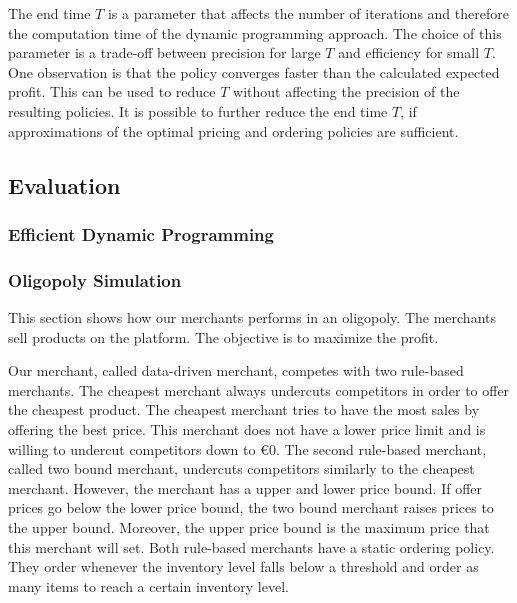 The end time $T$ is a parameter that affects the number of iterations and therefore the computation time of the dynamic programming approach.
The choice of this parameter is a trade-off between precision for large $T$ and efficiency for small $T$.
One observation is that the policy converges faster than the calculated expected profit.
This can be used to reduce $T$ without affecting the precision of the resulting policies.
It is possible to further reduce the end time $T$, if approximations of the optimal pricing and ordering policies are sufficient.


\subsection{Evaluation}
\subsubsection{Efficient Dynamic Programming}

\subsubsection{Oligopoly Simulation}
This section shows how our merchants performs in an oligopoly.
The merchants sell products on the \pricewars platform.
The objective is to maximize the profit.

Our merchant, called data-driven merchant, competes with two rule-based merchants.
The cheapest merchant always undercuts competitors in order to offer the cheapest product.
The cheapest merchant tries to have the most sales by offering the best price.
This merchant does not have a lower price limit and is willing to undercut competitors down to €0.
The second rule-based merchant, called two bound merchant, undercuts competitors similarly to the cheapest merchant.
However, the merchant has a upper and lower price bound.
If offer prices go below the lower price bound, the two bound merchant raises prices to the upper bound.
Moreover, the upper price bound is the maximum price that this merchant will set.
Both rule-based merchants have a static ordering policy.
They order whenever the inventory level falls below a threshold and order as many items to reach a certain inventory level.

